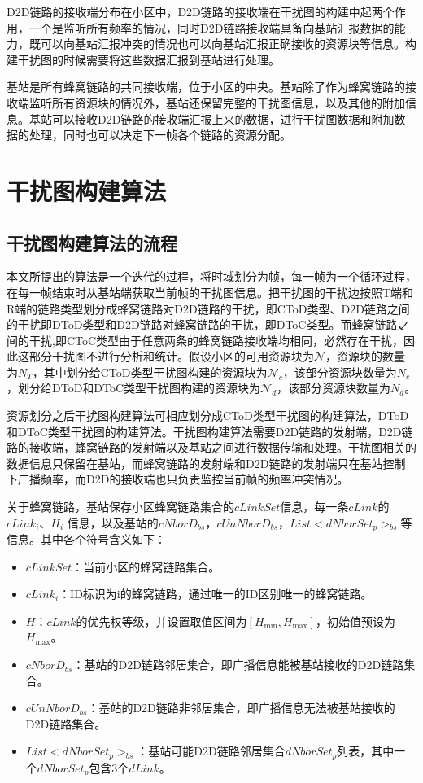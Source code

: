 \documentclass[figurelist,tablelist,algorithmlist,nomlist,masters]{seuthesix}
\begin{document}
	D2D链路的接收端分布在小区中，D2D链路的接收端在干扰图的构建中起两个作用，一个是监听所有频率的情况，同时D2D链路接收端具备向基站汇报数据的能力，既可以向基站汇报冲突的情况也可以向基站汇报正确接收的资源块等信息。构建干扰图的时候需要将这些数据汇报到基站进行处理。
	
	基站是所有蜂窝链路的共同接收端，位于小区的中央。基站除了作为蜂窝链路的接收端监听所有资源块的情况外，基站还保留完整的干扰图信息，以及其他的附加信息。基站可以接收D2D链路的接收端汇报上来的数据，进行干扰图数据和附加数据的处理，同时也可以决定下一帧各个链路的资源分配。
	
	
	\section{干扰图构建算法}
	
	\subsection{干扰图构建算法的流程}
	本文所提出的算法是一个迭代的过程，将时域划分为帧，每一帧为一个循环过程，在每一帧结束时从基站端获取当前帧的干扰图信息。把干扰图的干扰边按照T端和R端的链路类型划分成蜂窝链路对D2D链路的干扰，即CToD类型、D2D链路之间的干扰即DToD类型和D2D链路对蜂窝链路的干扰，即DToC类型。而蜂窝链路之间的干扰,即CToC类型由于任意两条的蜂窝链路接收端均相同，必然存在干扰，因此这部分干扰图不进行分析和统计。假设小区的可用资源块为$\mathcal{N}$，资源块的数量为$N_T$，其中划分给CToD类型干扰图构建的资源块为$\mathcal{N}_c$，该部分资源块数量为$N_c$，划分给DToD和DToC类型干扰图构建的资源块为$\mathcal{N}_d$，该部分资源块数量为$N_d$。
	
	资源划分之后干扰图构建算法可相应划分成CToD类型干扰图的构建算法，DToD和DToC类型干扰图的构建算法。干扰图构建算法需要D2D链路的发射端，D2D链路的接收端，蜂窝链路的发射端以及基站之间进行数据传输和处理。干扰图相关的数据信息只保留在基站，而蜂窝链路的发射端和D2D链路的发射端只在基站控制下广播频率，而D2D的接收端也只负责监控当前帧的频率冲突情况。
	
	关于蜂窝链路，基站保存小区蜂窝链路集合的$cLinkSet$信息，每一条$cLink$的$cLink_i$、${H_i}$ 信息，以及基站的$cNborD_{bs}$，$cUnNborD_{bs}$，$List < dNborSet_{p}{ > _{bs}}$等信息。其中各个符号含义如下：
	
	\begin{itemize}
		\item $cLinkSet$：当前小区的蜂窝链路集合。
		\item $cLink_i$：ID标识为i的蜂窝链路，通过唯一的ID区别唯一的蜂窝链路。
		\item ${H}$：$cLink$的优先权等级，并设置取值区间为$\left[ {{H_{\min }},{H_{\max }}} \right]$，初始值预设为${H_{\max }}$。
		\item $cNborD_{bs}$：基站的D2D链路邻居集合，即广播信息能被基站接收的D2D链路集合。
		\item $cUnNborD_{bs}$：基站的D2D链路非邻居集合，即广播信息无法被基站接收的D2D链路集合。
		\item $List < dNborSet_{p}{ > _{bs}}$：基站可能D2D链路邻居集合$dNborSet_{p}$列表，其中一个$dNborSet_{p}$包含3个$dLink$。
	\end{itemize}
	
\end{document}
